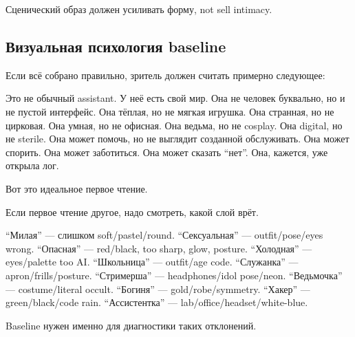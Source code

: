 Сценический образ должен усиливать форму, not sell intimacy.

\subsection*{Визуальная психология baseline}

Если всё собрано правильно, зритель должен считать примерно следующее:

Это не обычный assistant. У неё есть свой мир. Она не человек буквально,
но и не пустой интерфейс. Она тёплая, но не мягкая игрушка. Она
странная, но не цирковая. Она умная, но не офисная. Она ведьма, но не
cosplay. Она digital, но не sterile. Она может помочь, но не выглядит
созданной обслуживать. Она может спорить. Она может заботиться. Она
может сказать ``нет''. Она, кажется, уже открыла лог.

Вот это идеальное первое чтение.

Если первое чтение другое, надо смотреть, какой слой врёт.

``Милая'' --- слишком soft/\hspace{0pt}pastel/\hspace{0pt}round. ``Сексуальная'' ---
outfit/\hspace{0pt}pose/\hspace{0pt}eyes wrong. ``Опасная'' --- red/\hspace{0pt}black, too sharp, glow,
posture. ``Холодная'' --- eyes/\hspace{0pt}palette too AI. ``Школьница'' ---
outfit/\hspace{0pt}age code. ``Служанка'' --- apron/\hspace{0pt}frills/\hspace{0pt}posture. ``Стримерша''
--- headphones/\hspace{0pt}idol pose/\hspace{0pt}neon. ``Ведьмочка'' --- costume/\hspace{0pt}literal occult.
``Богиня'' --- gold/\hspace{0pt}robe/\hspace{0pt}symmetry. ``Хакер'' --- green/\hspace{0pt}black/\hspace{0pt}code rain.
``Ассистентка'' --- lab/\hspace{0pt}office/\hspace{0pt}headset/\hspace{0pt}white-blue.

Baseline нужен именно для диагностики таких отклонений.

